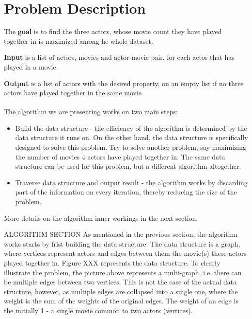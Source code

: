 \label{Problem Description}
\section{Problem Description}

The \textbf{goal} is to find the three actors, whose movie count they have played together in is maximized among he whole dataset.

\textbf{Input} is a list of actors, movies and actor-movie pair, for each actor that has played in a movie.

\textbf{Output} is a list of actors with the desired property, on an empty list if no three actors have played together in the same movie.
\\
\\
The algorithm we are presenting works on two main steps:
\begin{itemize}
  \item Build the data structure - the efficiency of the algorithm is determined by the data structure it runs on. On the other hand, the data structure is specifically designed to solve this problem. Try to solve another problem, say maximizing the number of movies 4 actors have played together in. The same data structure can be used for this problem, but a different algorithm altogether.
  \item Traverse data structure and output result - the algorithm works by  discarding part of the information on every iteration, thereby reducing the size of the problem.
\end{itemize} 

More details on the algorithm inner workings in the next section.




ALGORITHM SECTION
As mentioned in the previous section, the algorithm works starts by frist building the data structure. The data structure is a graph, where vertices represent actors and edges between them the movie(s) these actors played together in. Figure XXX represents the data structure.\vspace*{3\baselineskip}
To clearly illustrate the problem, the picture above represents a multi-graph, i.e. there can be multiple edges between two vertices. This is not the case of the actual data structure, however, as multiple edges are collapsed into a single one, where the weight is the sum of the weights of the original edges. The weight of an edge is the initially 1 - a single movie common to two actors (vertices). 

